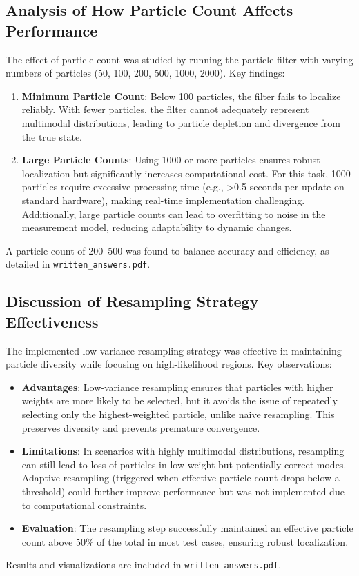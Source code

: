 \documentclass[11pt]{article}
\begin{document}
\subsection{Analysis of How Particle Count Affects Performance}
The effect of particle count was studied by running the particle filter with varying numbers of particles (50, 100, 200, 500, 1000, 2000). Key findings:
\begin{enumerate}
    \item \textbf{Minimum Particle Count}: Below 100 particles, the filter fails to localize reliably. With fewer particles, the filter cannot adequately represent multimodal distributions, leading to particle depletion and divergence from the true state.
    \item \textbf{Large Particle Counts}: Using 1000 or more particles ensures robust localization but significantly increases computational cost. For this task, 1000 particles require excessive processing time (e.g., >0.5 seconds per update on standard hardware), making real-time implementation challenging. Additionally, large particle counts can lead to overfitting to noise in the measurement model, reducing adaptability to dynamic changes.
\end{enumerate}
A particle count of 200--500 was found to balance accuracy and efficiency, as detailed in \texttt{written\_answers.pdf}.

\subsection{Discussion of Resampling Strategy Effectiveness}
The implemented low-variance resampling strategy was effective in maintaining particle diversity while focusing on high-likelihood regions. Key observations:
\begin{itemize}
    \item \textbf{Advantages}: Low-variance resampling ensures that particles with higher weights are more likely to be selected, but it avoids the issue of repeatedly selecting only the highest-weighted particle, unlike naive resampling. This preserves diversity and prevents premature convergence.
    \item \textbf{Limitations}: In scenarios with highly multimodal distributions, resampling can still lead to loss of particles in low-weight but potentially correct modes. Adaptive resampling (triggered when effective particle count drops below a threshold) could further improve performance but was not implemented due to computational constraints.
    \item \textbf{Evaluation}: The resampling step successfully maintained an effective particle count above 50\% of the total in most test cases, ensuring robust localization.
\end{itemize}
Results and visualizations are included in \texttt{written\_answers.pdf}.
\end{document}
